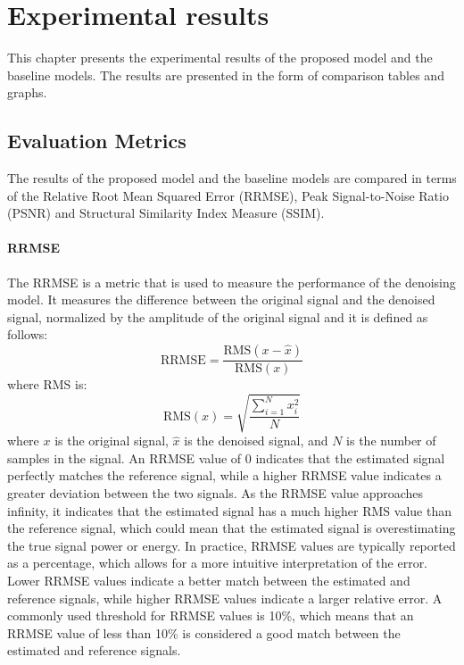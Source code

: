 \documentclass[a4paper]{sapthesis}
\begin{document}
\chapter{Experimental results}
This chapter presents the experimental results of the proposed model and
the baseline models. The results are presented in the form of comparison tables
and graphs. 
\section{Evaluation Metrics}
The results of the proposed model and the baseline models are compared 
in terms of the Relative Root Mean Squared Error (RRMSE), Peak 
Signal-to-Noise Ratio (PSNR) and Structural Similarity Index Measure (SSIM).
\subsubsection{RRMSE}
The RRMSE is a metric that is used to measure the performance of the
denoising model. It measures the difference between the original signal
 and the denoised signal, normalized by the amplitude of the original 
 signal and it is defined as follows:
\begin{equation}
\text{RRMSE} = \frac{\text{RMS}(x-\hat{x})}{\text{RMS}(x)}
\end{equation}
where RMS is:
\begin{equation}
\text{RMS}(x) = \sqrt{\frac{\sum_{i=1}^{N}{x_i^2}}{N}}
\end{equation}
where $x$ is the original signal, $\hat{x}$ is the denoised signal,
  and $N$ is the number of samples in the signal.\newline
  An RRMSE value of 0 indicates that the estimated signal perfectly 
  matches the reference signal, while a higher RRMSE value indicates 
  a greater deviation between the two signals. As the RRMSE value 
  approaches infinity, it indicates that the estimated signal has a 
  much higher RMS value than the reference signal, which could mean 
  that the estimated signal is overestimating the true signal power 
  or energy.\newline
  In practice, RRMSE values are typically reported as a percentage, 
  which allows for a more intuitive interpretation of the error. 
  Lower RRMSE values indicate a better match between the estimated 
  and reference signals, while higher RRMSE values indicate a larger 
  relative error. A commonly used threshold for RRMSE values is 10\%, 
  which means that an RRMSE value of less than 10\% is considered 
  a good match between the estimated and reference signals. 
\end{document}
